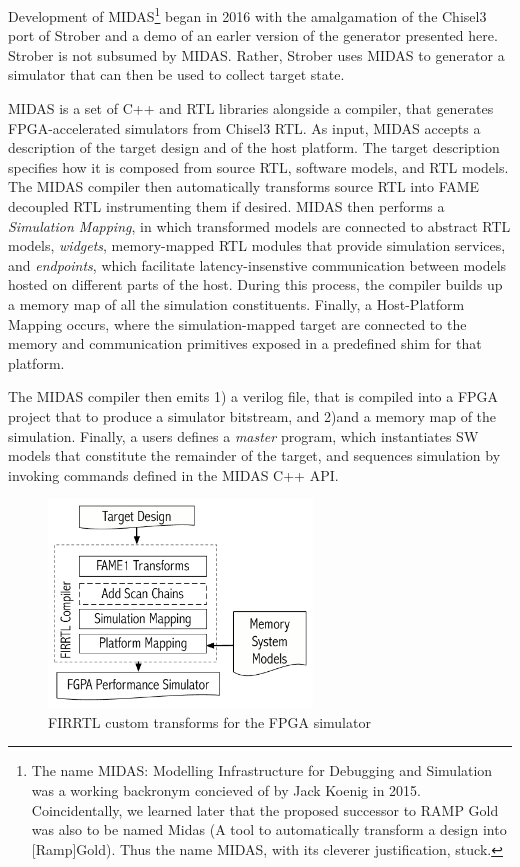 Development of MIDAS\footnote{The name MIDAS: Modelling Infrastructure for
Debugging and Simulation was a working backronym concieved of by Jack Koenig in
2015. Coincidentally, we learned later that the proposed successor to RAMP Gold
was also to be named Midas (A tool to automatically transform a design into
[Ramp]Gold). Thus the name MIDAS, with its cleverer justification, stuck.} began in 2016
with the amalgamation of the Chisel3 port of Strober and a demo of an earler
version of the generator presented here. Strober is not subsumed by MIDAS.
Rather, Strober uses MIDAS to generator a simulator that can then be used to
collect target state.

MIDAS is a set of C++ and RTL libraries alongside a compiler, that generates
FPGA-accelerated simulators from Chisel3 RTL. As input, MIDAS accepts a
description of the target design and of the host platform. The target
description specifies how it is composed from source RTL, software models, and
RTL models. The MIDAS compiler then automatically transforms source RTL into
FAME decoupled RTL instrumenting them if desired. MIDAS then performs a
\emph{Simulation Mapping}, in which transformed models are connected to
abstract RTL models, \textit{widgets}, memory-mapped RTL modules that provide
simulation services, and \textit{endpoints}, which facilitate
latency-insenstive communication between models hosted on different parts of
the host. During this process, the compiler builds up a memory map of all the
simulation constituents.  Finally, a {Host-Platform Mapping} occurs, where the
simulation-mapped target are connected to the memory and communication
primitives exposed in a predefined shim for that platform.

The MIDAS compiler then emits 1) a verilog file, that is compiled into a FPGA
project that to produce a simulator bitstream, and 2)and a memory map of the
simulation. Finally, a users defines a \emph{master} program, which
instantiates SW models that constitute the remainder of the target, and
sequences simulation by invoking commands defined in the MIDAS C++ API.

\begin{figure}
	\centering
	\includegraphics[width=7cm]{figures/firrtl.pdf}
	\caption{FIRRTL custom transforms for the FPGA simulator}
	\label{fig:firrtl}
\end{figure}

